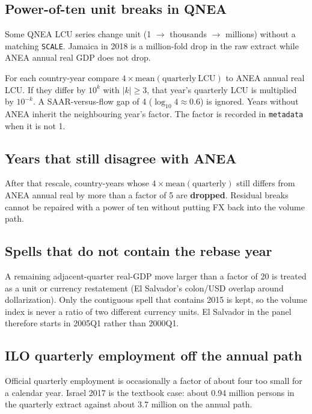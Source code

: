 \documentclass[11pt]{article}
\begin{document}
\subsection{Power-of-ten unit breaks in QNEA}

Some QNEA LCU series change unit (1 $\to$ thousands $\to$ millions) without a
matching \texttt{SCALE}. Jamaica in 2018 is a million-fold drop in the raw
extract while ANEA annual real GDP does not drop.

For each country-year compare $4\times\mathrm{mean(quarterly\ LCU)}$ to ANEA
annual real LCU. If they differ by $10^{k}$ with $|k|\ge 3$, that year's
quarterly LCU is multiplied by $10^{-k}$. A SAAR-versus-flow gap of 4
($\log_{10}4\approx 0.6$) is ignored. Years without ANEA inherit the
neighbouring year's factor. The factor is recorded in \texttt{metadata} when
it is not 1.

\subsection{Years that still disagree with ANEA}

After that rescale, country-years whose $4\times\mathrm{mean(quarterly)}$
still differs from ANEA annual real by more than a factor of 5 are
\textbf{dropped}. Residual breaks cannot be repaired with a power of ten
without putting FX back into the volume path.

\subsection{Spells that do not contain the rebase year}

A remaining adjacent-quarter real-GDP move larger than a factor of 20 is
treated as a unit or currency restatement (El Salvador's colon/USD overlap
around dollarization). Only the contiguous spell that contains 2015 is kept,
so the volume index is never a ratio of two different currency units. El
Salvador in the panel therefore starts in 2005Q1 rather than 2000Q1.

\subsection{ILO quarterly employment off the annual path}

Official quarterly employment is occasionally a factor of about four too
small for a calendar year. Israel 2017 is the textbook case: about 0.94
million persons in the quarterly extract against about 3.7 million on the
annual path.
\end{document}
